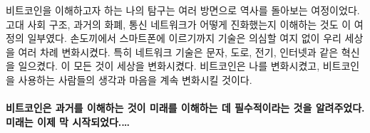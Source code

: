 \begin{comment}
	My quest of trying to make sense of Bitcoin has led me down the pathways
	of history in more ways than one. Understanding ancient societal
	structures, past monies, and how communication networks evolved were all
	part of the journey. From the handaxe to the smartphone, technology has
	undoubtedly changed our world many times over. Networked technologies
	are especially transformational: writing, roads, electricity, the
	internet. All of them changed the world. Bitcoin has changed mine and
	will continue to change the minds and hearts of those who dare to use
	it.
\end{comment}
비트코인을 이해하고자 하는 나의 탐구는 여러 방면으로 역사를 돌아보는 여정이었다.
고대 사회 구조, 과거의 화폐, 통신 네트워크가 어떻게 진화했는지 이해하는 것도 이 여정의 일부였다.
손도끼에서 스마트폰에 이르기까지 기술은 의심할 여지 없이 우리 세상을 여러 차례 변화시켰다.
특히 네트워크 기술은 문자, 도로, 전기, 인터넷과 같은 혁신을 일으켰다.
이 모든 것이 세상을 변화시켰다. 
비트코인은 나를 변화시켰고, 비트코인을 사용하는 사람들의 생각과 마음을 계속 변화시킬 것이다.

\paragraph{비트코인은 과거를 이해하는 것이 미래를 이해하는 데 필수적이라는 것을 알려주었다. 미래는 이제 막 시작되었다.\ldots}

